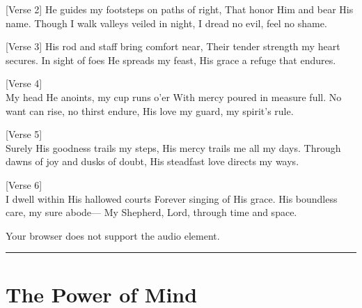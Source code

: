 \documentclass[
]{book}
\begin{document}
{[}Verse 2{]}
He guides my footsteps on paths of right,
That honor Him and bear His name.
Though I walk valleys veiled in night,
I dread no evil, feel no shame.

{[}Verse 3{]}
His rod and staff bring comfort near,
Their tender strength my heart secures.
In sight of foes He spreads my feast,
His grace a refuge that endures.

{[}Verse 4{]} \\
My head He anoints, my cup runs o'er
With mercy poured in measure full.
No want can rise, no thirst endure,
His love my guard, my spirit's rule.

{[}Verse 5{]} \\
Surely His goodness trails my steps,
His mercy trails me all my days.
Through dawns of joy and dusks of doubt,
His steadfast love directs my ways.

{[}Verse 6{]} \\
I dwell within His hallowed courts
Forever singing of His grace.
His boundless care, my sure abode---
My Shepherd, Lord, through time and space.

Your browser does not support the audio element.

\begin{center}\rule{0.5\linewidth}{0.5pt}\end{center}

\hypertarget{the-power-of-mind}{%
\section*{The Power of Mind}\label{the-power-of-mind}}

  
\end{document}
